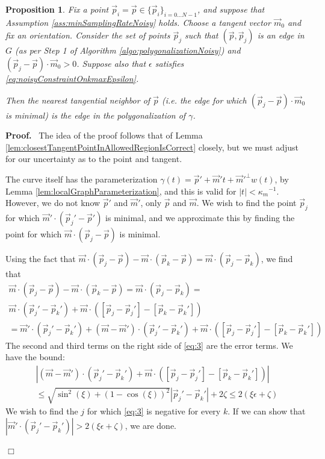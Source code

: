 \documentclass{article}
\newtheorem{proposition}[cntr]{Proposition}
\newenvironment{proof}{
  \noindent\textbf{Proof.}\ }{\hspace*{\fill}
  \begin{math}\Box\end{math}\medskip}
\numberwithin{cntr}{section}
\numberwithin{equation}{section}
\newcommand{\abs}[1]{\left| #1 \right|}%
\newcommand{\vp}[0]{{\vec{p}}}
\newcommand{\vm}[0]{{\vec{m}}}
\newcommand{\OtoN}{{0 \ldots N-1}}
\newcommand{\pointData}{{ \{ \vp_{i} \}_{i=\OtoN} }}
\newcommand{\curvemax}{{\kappa_{m}}}
\newcommand{\curvemaxi}{{\curvemax^{-1}}}
\newcommand{\pointNoise}{{\zeta}}
\newcommand{\tanNoise}{{\xi}}
\begin{document}
\begin{proposition}
  \label{lem:noisyClosestTangentPointInAllowedRegionIsCorrect}
  Fix a point $\vp_{i}=\vp \in \pointData$, and suppose that Assumption \ref{ass:minSamplingRateNoisy} holds. Choose a tangent vector $\vm_{0}$ and fix an orientation. Consider the set of points $\vp_{j}$ such that $(\vp, \vp_{j})$ is an edge in $G$ (as per Step 1 of Algorithm \ref{algo:polygonalizationNoisy}) and $(\vp_{j} - \vp) \cdot \vm_{0} > 0$. Suppose also that $\epsilon$ satisfies \eqref{eq:noisyConstraintOnkmaxEpsilon}.

  Then the nearest tangential neighbor of $\vp$ (i.e. the edge for which $(\vp_{j} - \vp) \cdot \vm_{0}$ is minimal) is the edge in the polygonalization of $\gamma$.
\end{proposition}

\begin{proof}
  The idea of the proof follows that of Lemma \ref{lem:closestTangentPointInAllowedRegionIsCorrect} closely, but we must adjust for our uncertainty as to the point and tangent.

  The curve itself has the parameterization $\gamma(t) = \vp' + \vm' t + \vm'^{\perp} w(t)$, by Lemma \ref{lem:localGraphParameterization}, and this is valid for $\abs{t} < \curvemaxi$. However, we do not know $\vp'$ and $\vm'$, only $\vp$ and $\vm$. We wish to find the point $\vp_{j}$ for which $\vm' \cdot (\vp_{j}' - \vp')$ is minimal, and we approximate this by finding the point for which $\vm \cdot (\vp_{j} - \vp)$ is minimal.

Using the fact that $\vm \cdot (\vp_{j} - \vp) - \vm \cdot (\vp_{k} - \vp) = \vm \cdot (\vp_{j}- \vp_{k})$, we find that
\begin{multline}
  \label{eq:3}
  \vm \cdot (\vp_{j} - \vp) - \vm \cdot (\vp_{k} - \vp) =
  \vm \cdot (\vp_{j}- \vp_{k}) = \\
  \vm \cdot (\vp_{j}' - \vp_{k}') + \vm \cdot ([\vp_{j} - \vp_{j}'] - [\vp_{k} - \vp_{k}']) \\
  = \vm' \cdot (\vp_{j}' - \vp_{k}') + (\vm - \vm') \cdot (\vp_{j}' - \vp_{k}')  + \vm \cdot ([\vp_{j} - \vp_{j}'] - [\vp_{k} - \vp_{k}'])
\end{multline}
The second and third terms on the right side of \eqref{eq:3} are the error terms. We have the bound:
\begin{multline*}
  \abs{(\vm - \vm') \cdot (\vp_{j}' - \vp_{k}')  + \vm \cdot ([\vp_{j} - \vp_{j}'] - [\vp_{k} - \vp_{k}'])} \\
  \leq \sqrt{\sin^{2}(\tanNoise) + (1-\cos(\tanNoise) )^{2}} \abs{\vp_{j}' - \vp_{k}'} + 2 \pointNoise
  \leq 2 (\tanNoise \epsilon + \pointNoise)
\end{multline*}
We wish to find the $j$ for which \eqref{eq:3} is negative for every $k$. If we can show that $\abs{\vm' \cdot (\vp_{j}' - \vp_{k}')} > 2(\tanNoise \epsilon + \pointNoise)$, we are done.


\end{proof}
\end{document}
